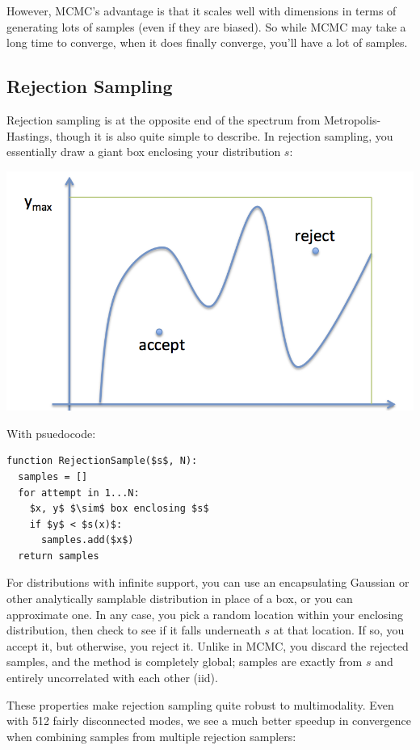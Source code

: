 \documentclass{article}
\begin{document}
However, MCMC's advantage is that it scales well with dimensions in terms of
generating lots of samples (even if they are biased). So while MCMC may take a
long time to converge, when it does finally converge, you'll have a lot of
samples.

\subsection{Rejection Sampling}

Rejection sampling is at the opposite end of the spectrum from
Metropolis-Hastings, though it is also quite simple to describe. In rejection
sampling, you essentially draw a giant box enclosing your distribution $s$:

\includegraphics[width=\textwidth]{rej-illust.png}

With psuedocode:

\begin{lstlisting}[mathescape=true]
function RejectionSample($s$, N):
  samples = []
  for attempt in 1...N:
    $x, y$ $\sim$ box enclosing $s$
    if $y$ < $s(x)$:
      samples.add($x$)
  return samples
\end{lstlisting}

For distributions with infinite support, you can use an encapsulating Gaussian
or other analytically samplable distribution in place of a box, or you can
approximate one. In any case, you pick a random location within your enclosing
distribution, then check to see if it falls underneath $s$ at that
location. If so, you accept it, but otherwise, you reject it. Unlike in MCMC,
you discard the rejected samples, and the method is completely global; samples
are exactly from $s$ and entirely uncorrelated with each other (iid).

These properties make rejection sampling quite robust to multimodality. Even
with 512 fairly disconnected modes, we see a much better speedup in convergence
when combining samples from multiple rejection samplers:
\end{document}
